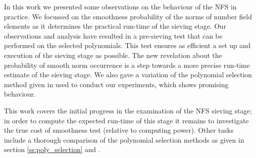 \documentclass[a4paper, 12pt, envcountsect, runningheads]{llncs}
\numberwithin{figure}{section}
\numberwithin{equation}{section}
\begin{document}
In this work we presented some observations on the behaviour of the NFS in practice. We focussed on the smoothness probability of the norms of number field elements as it determines the practical run-time of the sieving stage. Our observations and analysis have resulted in a pre-sieving test that can be performed on the selected polynomials. This test ensures as efficient a set up and execution of the sieving stage as possible. The new revelation about the probability of smooth norm occurrence is a step towards a more precise run-time estimate of the sieving stage. We also gave a variation of the polynomial selection method given in \cite{joux-lercier-smart-vercauteren06} used to conduct our experiments, which shows promising behaviour.

This work covers the initial progress in the examination of the NFS sieving stage; in order to compute the expected run-time of this stage it remains to investigate the true cost of smoothness test (relative to computing power). Other tasks include a thorough comparison of the polynomial selection methods as given in section \ref{ss:poly_selection} and \cite{joux-lercier-smart-vercauteren06}. 




\newpage
\appendix
\end{document}

